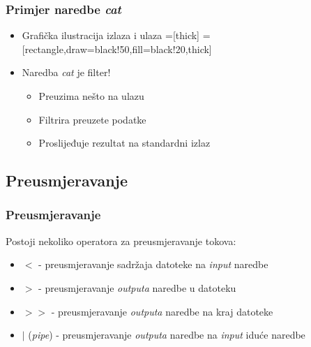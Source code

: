 \documentclass{beamer}
\begin{document}
\begin{frame}[t]
\frametitle{Primjer naredbe \textit{cat}}
\begin{itemize}
  \item Grafička ilustracija izlaza i ulaza
  \vspace{1cm}
  =[thick]
  =[rectangle,draw=black!50,fill=black!20,thick]
  \vspace{1cm}
  \item Naredba \textit{cat} je filter!
  \begin{itemize}
    \item Preuzima nešto na ulazu
    \item Filtrira preuzete podatke
    \item Proslijeđuje rezultat na standardni izlaz
  \end{itemize}
\end{itemize}
\end{frame}

\subsection{Preusmjeravanje}
\begin{frame}[t]
\frametitle{Preusmjeravanje}
  Postoji nekoliko operatora za preusmjeravanje tokova:
  \begin{itemize}
    \item $<$ - preusmjeravanje sadržaja datoteke na \textit{input} naredbe
    \item $>$ - preusmjeravanje \textit{outputa} naredbe u datoteku
    \item $>>$ - preusmjeravanje \textit{outputa} naredbe na kraj datoteke
    \item $|$ (\textit{pipe}) - preusmjeravanje \textit{outputa} naredbe na \textit{input} iduće naredbe
  \end{itemize}
\end{frame}
\end{document}
